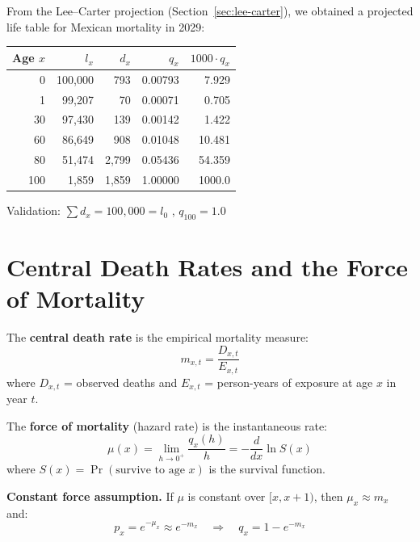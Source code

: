 \documentclass[11pt,a4paper]{article}
\theoremstyle{definition}
\begin{document}
\begin{application}
From the Lee--Carter projection (Section~\ref{sec:lee-carter}), we obtained
a projected life table for Mexican mortality in 2029:

\begin{center}
\begin{tabular}{rrrrr}
\toprule
Age $x$ & $l_x$ & $d_x$ & $q_x$ & $1000 \cdot q_x$ \\
\midrule
 0 & 100{,}000 & 793 & 0.00793 & 7.929 \\
 1 &  99{,}207 &  70 & 0.00071 & 0.705 \\
30 &  97{,}430 & 139 & 0.00142 & 1.422 \\
60 &  86{,}649 & 908 & 0.01048 & 10.481 \\
80 &  51{,}474 & 2{,}799 & 0.05436 & 54.359 \\
100 &   1{,}859 & 1{,}859 & 1.00000 & 1000.0 \\
\bottomrule
\end{tabular}
\end{center}

Validation: $\sum d_x = 100{,}000 = l_0$ \checkmark, \;
$q_{100} = 1.0$ \checkmark
\end{application}

\section{Central Death Rates and the Force of Mortality}
\label{sec:force-of-mortality}

\begin{formaldef}
The \textbf{central death rate} is the empirical mortality measure:
\begin{equation}
  m_{x,t} = \frac{D_{x,t}}{E_{x,t}}
  \label{eq:central-rate}
\end{equation}
where $D_{x,t}$ = observed deaths and $E_{x,t}$ = person-years of exposure
at age $x$ in year $t$.

The \textbf{force of mortality} (hazard rate) is the instantaneous rate:
\begin{equation}
  \mu(x) = \lim_{h \to 0^+} \frac{q_x(h)}{h}
  = -\frac{d}{dx} \ln S(x)
  \label{eq:force}
\end{equation}
where $S(x) = \Pr(\text{survive to age } x)$ is the survival function.

\textbf{Constant force assumption.} If $\mu$ is constant over $[x, x+1)$,
then $\mu_x \approx m_x$ and:
\begin{equation}
  p_x = e^{-\mu_x} \approx e^{-m_x}
  \quad\Longrightarrow\quad
  \boxed{q_x = 1 - e^{-m_x}}
  \label{eq:mx-to-qx}
\end{equation}
\end{formaldef}
\end{document}
